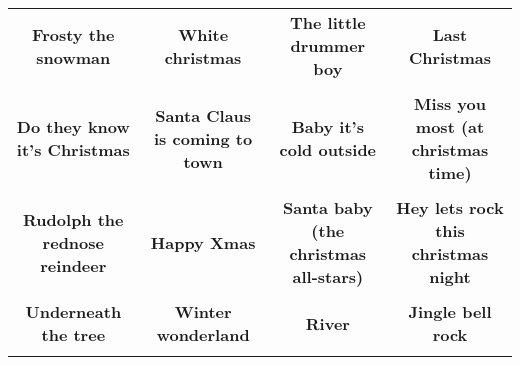 \documentclass[12pt]{article} \usepackage{eso-pic, graphicx}
\newcommand{\background}[1]{%
\AddToShipoutPictureBG*{\texttt{[image: \#1]}}
}
\begin{document}
\tabcolsep=30.2pt \renewcommand{\arraystretch}{4.5}   \vspace*{4.3cm} \begin{center}  \begin{tabular}{c c c c}
\parbox{3cm}{\centering \textbf{Frosty the snowman}}& 
\parbox{3cm}{\centering \textbf{White christmas}}& 
\parbox{3cm}{\centering \textbf{The little drummer boy}}& 
\parbox{3cm}{\centering \textbf{Last Christmas}}\\ \\ 
\parbox{3cm}{\centering \textbf{Do they know it's Christmas}}& 
\parbox{3cm}{\centering \textbf{Santa Claus is coming to town}}& 
\parbox{3cm}{\centering \textbf{Baby it’s cold outside}}& 
\parbox{3cm}{\centering \textbf{Miss you most (at christmas time)}}\\ \\ 
\parbox{3cm}{\centering \textbf{Rudolph the rednose reindeer}}& 
\parbox{3cm}{\centering \textbf{Happy Xmas}}& 
\parbox{3cm}{\centering \textbf{Santa baby (the christmas all-stars)}}& 
\parbox{3cm}{\centering \textbf{Hey lets rock this christmas night}}\\ \\ 
\parbox{3cm}{\centering \textbf{Underneath the tree}}& 
\parbox{3cm}{\centering \textbf{Winter wonderland}}& 
\parbox{3cm}{\centering \textbf{River}}& 
\parbox{3cm}{\centering \textbf{Jingle bell rock}}\\ \\ 
\end{tabular} \background{discobingo.pdf} \end{center} 
\end{document}
